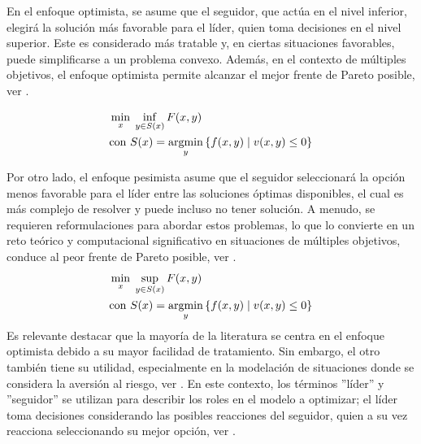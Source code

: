 En el enfoque optimista, se asume que el seguidor, que actúa en el nivel inferior, elegirá la solución más favorable para el líder, quien toma decisiones en el nivel superior. Este es considerado más tratable y, en ciertas situaciones favorables, puede simplificarse a un problema convexo. Además, en el contexto de múltiples objetivos, el enfoque optimista permite alcanzar el mejor frente de Pareto posible, ver \cite{DempeyZemkoho2020}.

    \begin{equation}
    \begin{aligned}
    & \min_{x} \; \inf_{y \in S(x)} F(x, y) \\
    & \text{con } S(x) = \operatorname*{argmin}_{y} \left\{ f(x, y) \mid v(x, y) \leq 0 \right\}
    \end{aligned}
    \label{eq:EnfoqueOptimistaGeneral}
    \end{equation}

Por otro lado, el enfoque pesimista asume que el seguidor seleccionará la opción menos favorable para el líder entre las soluciones óptimas disponibles, el cual es más complejo de resolver y puede incluso no tener solución. A menudo, se requieren reformulaciones para abordar estos problemas, lo que lo convierte en un reto teórico y computacional significativo en situaciones de múltiples objetivos, conduce al peor frente de Pareto posible, ver \cite{Sinha2017ARO}.
\begin{equation}
\begin{aligned}
& \min_{x} \; \sup_{y \in S(x)} F(x, y) \\
& \text{con } S(x) = \operatorname*{argmin}_{y} \left\{ f(x, y) \mid v(x, y) \leq 0 \right\}
\end{aligned}
\label{eq:EnfoquePesimistaGeneral}
\end{equation}
Es relevante destacar que la mayoría de la literatura se centra en el enfoque optimista debido a su mayor facilidad de tratamiento. Sin embargo, el otro también tiene su utilidad, especialmente en la modelación de situaciones donde se considera la aversión al riesgo, ver \cite{DempeyZemkoho2020}. En este contexto, los términos ''líder'' y ''seguidor'' se utilizan para describir los roles en el modelo a optimizar; el líder toma decisiones considerando las posibles reacciones del seguidor, quien a su vez reacciona seleccionando su mejor opción, ver \cite{Sinha2017ARO}.

